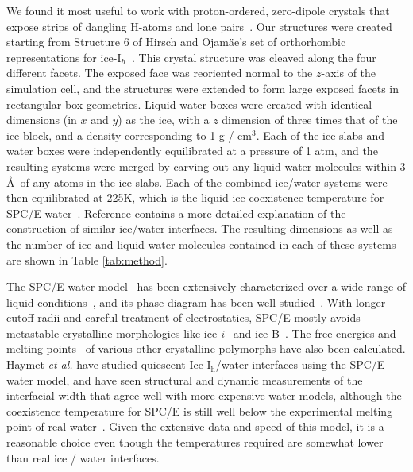 We found it most useful to work with proton-ordered, zero-dipole
crystals that expose strips of dangling H-atoms and lone
pairs~\cite{Buch:2008fk}.  Our structures were created starting from
Structure 6 of Hirsch and Ojam\"{a}e's set of orthorhombic
representations for ice-I$_{h}$~\cite{Hirsch04}.  This crystal
structure was cleaved along the four different facets.  The exposed
face was reoriented normal to the $z$-axis of the simulation cell, and
the structures were extended to form large exposed facets in
rectangular box geometries.  Liquid water boxes were created with
identical dimensions (in $x$ and $y$) as the ice, with a $z$ dimension
of three times that of the ice block, and a density corresponding to 1
g / cm$^3$.  Each of the ice slabs and water boxes were independently
equilibrated at a pressure of 1 atm, and the resulting systems were
merged by carving out any liquid water molecules within 3 \AA\ of any
atoms in the ice slabs.  Each of the combined ice/water systems were
then equilibrated at 225K, which is the liquid-ice coexistence
temperature for SPC/E water~\cite{Bryk02}. Reference
\citealp{Louden13} contains a more detailed explanation of the
construction of similar ice/water interfaces. The resulting dimensions
as well as the number of ice and liquid water molecules contained in
each of these systems are shown in Table \ref{tab:method}.

The SPC/E water model~\cite{Berendsen87} has been extensively
characterized over a wide range of liquid
conditions~\cite{Arbuckle02,Kuang12}, and its phase diagram has been
well studied~\cite{Baez95,Bryk04b,Sanz04b,Fennell:2005fk}. With longer
cutoff radii and careful treatment of electrostatics, SPC/E mostly
avoids metastable crystalline morphologies like
ice-\textit{i}~\cite{Fennell:2005fk} and ice-B~\cite{Baez95}.  The
free energies and melting
points~\cite{Baez95,Arbuckle02,Gay02,Bryk02,Bryk04b,Sanz04b,Fennell:2005fk,Fernandez06,Abascal07,Vrbka07}
of various other crystalline polymorphs have also been calculated.
Haymet \textit{et al.} have studied quiescent Ice-I$_\mathrm{h}$/water
interfaces using the SPC/E water model, and have seen structural and
dynamic measurements of the interfacial width that agree well with
more expensive water models, although the coexistence temperature for
SPC/E is still well below the experimental melting point of real
water~\cite{Bryk02}. Given the extensive data and speed of this model,
it is a reasonable choice even though the temperatures required are
somewhat lower than real ice / water interfaces.

